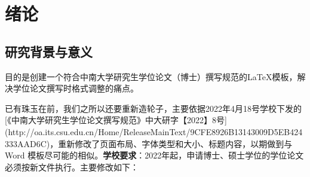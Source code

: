 \section{绪论}
\subsection{研究背景与意义}

目的是创建一个符合中南大学研究生学位论文（博士）撰写规范的LaTeX模板，解决学位论文撰写时格式调整的痛点。

已有珠玉在前，我们之所以还要重新造轮子，主要依据2022年4月18号学校下发的[《中南大学研究生学位论文撰写规范》中大研字【2022】8号] (http://oa.its.csu.edu.cn/Home/ReleaseMainText/9CFE8926B13143009D5EB424333AAD6C)，重新修改了页面布局、字体类型和大小、标题内容，以期做到与 Word 模板尽可能的相似。\textbf{学校要求}：2022年起，申请博士、硕士学位的学位论文必须按新文件执行。主要修改如下：
